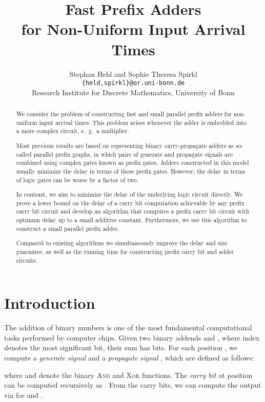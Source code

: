 \documentclass[11pt,final,microtype]{scrartcl}
\title{Fast Prefix Adders\\ for Non-Uniform Input Arrival Times}
\author{Stephan Held and Sophie Theresa Spirkl \\
\normalsize {\tt \{held,spirkl\}@or.uni-bonn.de}\\
  Research Institute for Discrete Mathematics, University of Bonn}
\date{}
\theoremstyle{plain}
\theoremstyle{definition}
\theoremstyle{remark}
\begin{document}
\maketitle

\begin{abstract}

  We consider the problem of constructing fast and small parallel
  prefix adders for non-uniform input arrival times. This problem
  arises whenever the adder is embedded into a more complex circuit,
  e.\ g.\ a multiplier.
  
  Most previous results are based on representing binary
  carry-propagate adders as so-called parallel prefix graphs, in which pairs of
  generate and propagate signals are combined using complex gates
  known as prefix gates. Adders constructed in this model usually
  minimize the delay in terms of these prefix gates. However, the delay
  in terms of logic gates can be worse by a factor of two.
  
  In contrast, we aim to minimize the delay of the underlying logic
  circuit directly.  We prove a lower bound on the delay of a carry
  bit computation achievable by any prefix carry bit circuit and
  develop an algorithm that computes a prefix carry bit circuit with
  optimum delay up to a small additive constant. Furthermore, we use
  this algorithm to construct a small parallel prefix adder.

  Compared to existing algorithms we simultaneously improve the delay
  and size guarantee, as well as the running time for constructing
  prefix carry bit and adder circuits.
\end{abstract}

\section{Introduction }

The addition of binary numbers is one of the most fundamental
computational tasks performed by computer chips.
Given two binary addends  and ,
where index  denotes the most significant bit, their sum 
has  bits. For each position , we compute a
\emph{generate signal}  and a \emph{propagate signal}
, which are defined as follows:

where  and  denote the binary \textsc{And} and
\textsc{Xor} functions.  The \emph{carry bit} at position  can be
computed recursively as  \cite{Kno01,WS58}.
From the carry bits, we can compute the output  via  for  and .
\end{document}
